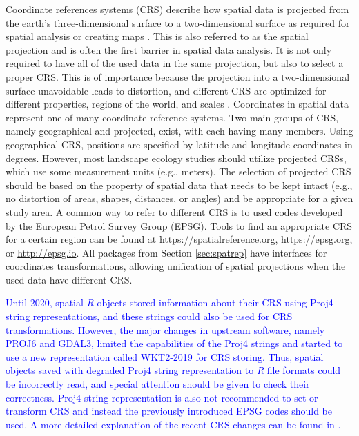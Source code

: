\documentclass[smallextended]{svjour3}       %
\begin{document}
Coordinate references systems (CRS) describe how spatial data is projected from the earth's three-dimensional surface to a two-dimensional surface as required for spatial analysis or creating maps \cite{Lovelace2019,Pebesma2019a}.
This is also referred to as the spatial projection and is often the first barrier in spatial data analysis.
It is not only required to have all of the used data in the same projection, but also to select a proper CRS.
This is of importance because the projection into a two-dimensional surface unavoidable leads to distortion, and different CRS are optimized for different properties, regions of the world, and scales \cite{Bivand2013,Lovelace2019}.
Coordinates in spatial data represent one of many coordinate reference systems.
Two main groups of CRS, namely geographical and projected, exist, with each having many members.
Using geographical CRS, positions are specified by latitude and longitude coordinates in degrees.
However, most landscape ecology studies should utilize projected CRSs, which use some measurement units (e.g., meters).
The selection of projected CRS should be based on the property of spatial data that needs to be kept intact (e.g., no distortion of areas, shapes, distances, or angles) and be appropriate for a given study area.
A common way to refer to different CRS is to used codes developed by the European Petrol Survey Group (EPSG).
Tools to find an appropriate CRS for a certain region can be found at \url{https://spatialreference.org}, \url{https://epsg.org}, or \url{http://epsg.io}.
All packages from Section \ref{sec:spatrep} have interfaces for coordinates transformations, allowing unification of spatial projections when the used data have different CRS.

\textcolor{blue}{Until 2020, spatial \textit{R} objects stored information about their CRS using Proj4 string representations, and these strings could also be used for CRS transformations.
However, the major changes in upstream software, namely PROJ6 and GDAL3, limited the capabilities of the Proj4 strings and started to use a new representation called WKT2-2019 for CRS storing.
Thus, spatial objects saved with degraded Proj4 string representation to \textit{R} file formats could be incorrectly read, and special attention should be given to check their correctness.
Proj4 string representation is also not recommended to set or transform CRS and instead the previously introduced EPSG codes should be used.
A more detailed explanation of the recent CRS changes can be found in \cite{Bivand2020}.}
\end{document}
